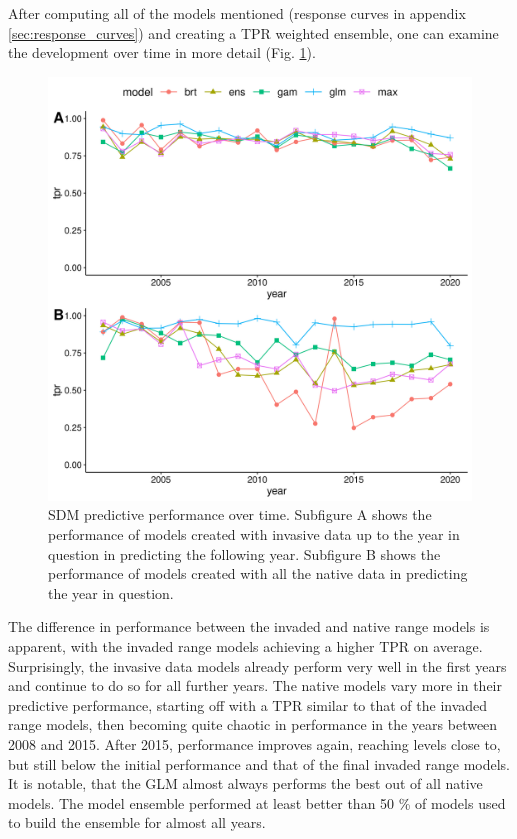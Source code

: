 \documentclass[12pt,a4paper]{article}
\begin{document}
After computing all of the models mentioned (response curves in appendix \ref{sec:response_curves}) and creating a TPR weighted ensemble, one can examine the development over time in more detail (Fig. \ref{fig:modelling_res}).

\begin{figure}[!h]
    \centering
    \includegraphics[width = 0.9\linewidth]{"../../R/figures/modelling-res.png"}
    \caption{\label{fig:modelling_res} SDM predictive performance over time. Subfigure A shows the performance of models created with invasive data up to the year in question in predicting the following year. Subfigure B shows the performance of models created with all the native data in predicting the year in question.}
\end{figure}

The difference in performance between the invaded and native range models is apparent, with the invaded range models achieving a higher TPR on average.
Surprisingly, the invasive data models already perform very well in the first years and continue to do so for all further years.
The native models vary more in their predictive performance, starting off with a TPR similar to that of the invaded range models, then becoming quite chaotic in performance in the years between 2008 and 2015.
After 2015, performance improves again, reaching levels close to, but still below the initial performance and that of the final invaded range models.
It is notable, that the GLM almost always performs the best out of all native models.
The model ensemble performed at least better than 50 \% of models used to build the ensemble for almost all years.
\end{document}
